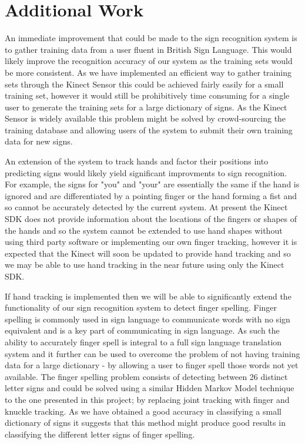 \chapter{Additional Work}
\ifpdf
    \graphicspath{{Chapter3/Chapter3Figs/PNG/}{Chapter3/Chapter3Figs/PDF/}{Chapter3/Chapter3Figs/}}
\else
    \graphicspath{{Chapter3/Chapter3Figs/EPS/}{Chapter3/Chapter3Figs/}}
\fi

An immediate improvement that could be made to the sign recognition system is to gather training data from a user fluent in British Sign Language. This would likely improve the recognition accuracy of our system as the training sets would be more consistent. As we have implemented an efficient way to gather training sets through the Kinect Sensor this could be achieved fairly easily for a small training set, however it would still be prohibitively time consuming for a single user to generate the training sets for a large dictionary of signs. As the Kinect Sensor is widely available this problem might be solved by crowd-sourcing the training database and allowing users of the system to submit their own training data for new signs.

An extension of the system to track hands and factor their positions into predicting signs would likely yield significant improvments to sign recognition. For example, the signs for "you" and "your" are essentially the same if the hand is ignored and are differentiated by a pointing finger or the hand forming a fist and so cannot be accurately detected by the current system. At present the Kinect SDK does not provide information about the locations of the fingers or shapes of the hands and so the system cannot be extended to use hand shapes without using third party software or implementing our own finger tracking, however it is expected that the Kinect will soon be updated to provide hand tracking and so we may be able to use hand tracking in the near future using only the Kinect SDK.

If hand tracking is implemented then we will be able to significantly extend the functionality of our sign recognition system to detect finger spelling. Finger spelling is commonly used in sign language to communicate words with no sign equivalent and is a key part of communicating in sign language. As such the ability to accurately finger spell is integral to a full sign language translation system and it further can be used to overcome the problem of not having training data for a large dictionary - by allowing a user to finger spell those words not yet available. The finger spelling problem consists of detecting between 26 distinct letter signs and could be solved using a similar Hidden Markov Model technique to the one presented in this project; by replacing joint tracking with finger and knuckle tracking. As we have obtained a good accuracy in classifying a small dictionary of signs it suggests that this method might produce good results in classifying the different letter signs of finger spelling.

